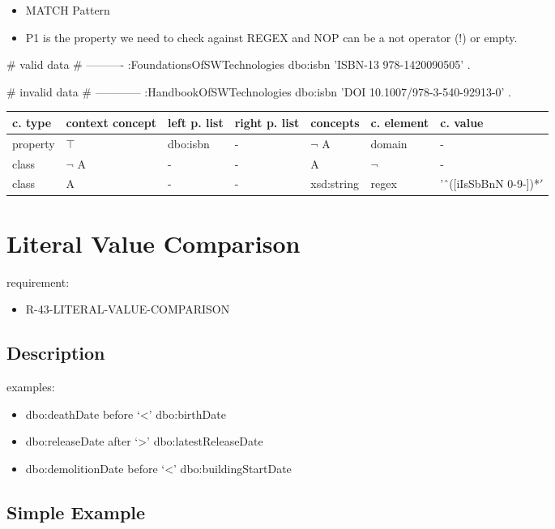 \documentclass{llncs}
\newenvironment{gcotable}{
  \scriptsize
  \sffamily
  \vspace{0.3cm}
  \begin{tabular}{l|l|l|l|l|l|l}
  \hline
  \textbf{c. type} & \textbf{context concept} & \textbf{left p. list} & \textbf{right p. list} & \textbf{concepts} & \textbf{c. element} & \textbf{c. value} \\
  \hline

}{
  \hline
  \end{tabular}
  \linebreak
}
\begin{document}
\begin{itemize}
	\item MATCH Pattern \cite{Kontokostas2014} 
  \item P1 is the property we need to check against REGEX and
NOP can be a not operator (!) or empty.
\end{itemize}

\begin{ex}
# valid data
# ----------
:FoundationsOfSWTechnologies
    dbo:isbn 'ISBN-13 978-1420090505' .
\end{ex}

\begin{ex}
# invalid data
# ------------
:HandbookOfSWTechnologies
    dbo:isbn 'DOI 10.1007/978-3-540-92913-0' .
\end{ex}

\begin{gcotable}
property & $\top$ & dbo:isbn & - & $\neg$ A & domain & - \\
class & $\neg$ A & - & - & A & $\neg$ & - \\
class & A & - & - & xsd:string & regex & 'ˆ([iIsSbBnN 0-9-])*$' $ \\
\end{gcotable}

\section{Literal Value Comparison}

requirement:

\begin{itemize}
	\item R-43-LITERAL-VALUE-COMPARISON
\end{itemize}

\subsection{Description}

examples:

\begin{itemize}
	\item dbo:deathDate before ‘<’ dbo:birthDate
  \item dbo:releaseDate after ‘>’ dbo:latestReleaseDate
  \item dbo:demolitionDate before ‘<’ dbo:buildingStartDate
\end{itemize}

\subsection{Simple Example}
\end{document}
